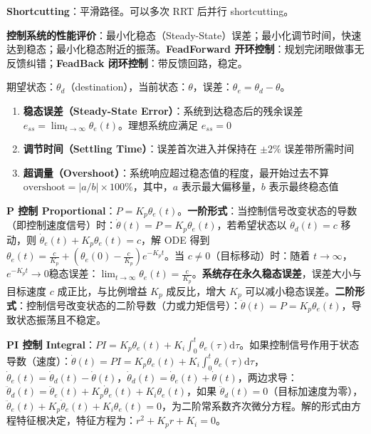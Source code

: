 \documentclass[
  8pt]{extarticle}
\begin{document}
\begin{multicols*}{4}
\textbf{Shortcutting}：平滑路径。可以多次 RRT 后并行 shortcutting。

\textbf{控制系统的性能评价}：最小化稳态（Steady-State）误差；最小化调节时间，快速达到稳态；最小化稳态附近的振荡。\textbf{FeadForward
开环控制}：规划完闭眼做事无反馈纠错；\textbf{FeadBack
闭环控制}：带反馈回路，稳定。

期望状态：\(\theta_d\)（destination），当前状态：\(\theta\)，误差：\(\theta_e = \theta_d - \theta\)。

\begin{enumerate}
\def\labelenumi{\arabic{enumi}.}
\item
  \textbf{稳态误差（Steady-State Error）}：系统到达稳态后的残余误差
  \(e_{ss} = \lim_{t\to\infty} \theta_e(t)\)。理想系统应满足
  \(e_{ss}=0\)
\item
  \textbf{调节时间（Settling Time）}：误差首次进入并保持在 \(\pm 2\%\)
  误差带所需时间
\item
  \textbf{超调量（Overshoot）}：系统响应超过稳态值的程度，最开始过去不算
  \(\text{overshoot} = |a/b| \times 100\%\)，其中，\(a\)
  表示最大偏移量，\(b\) 表示最终稳态值
\end{enumerate}

\textbf{P 控制
Proportional}：\(P = K_p\theta_e(t)\)。\textbf{一阶形式}：当控制信号改变状态的导数（即控制速度信号）时：\(\dot{\theta}(t) = P = K_p\theta_e(t)\)，若希望状态以
\(\dot{\theta}_d(t) = c\) 移动，则
\(\dot{\theta}_e(t) + K_p\theta_e(t) = c\)，解 ODE 得到
\(\theta_e(t) = \frac{c}{K_p} + \left(\theta_e(0) - \frac{c}{K_p}\right)e^{-K_pt}\)。当
\(c\neq0\)（目标移动）时：随着
\(t\rightarrow\infty\)，\(e^{-K_pt}\rightarrow0\)稳态误差：\(\lim_{t\rightarrow\infty}\theta_e(t) = \frac{c}{K_p}\)。\textbf{系统存在永久稳态误差}，误差大小与目标速度
\(c\) 成正比，与比例增益 \(K_p\) 成反比，增大 \(K_p\)
可以减小稳态误差。\textbf{二阶形式}：控制信号改变状态的二阶导数（力或力矩信号）：\(\ddot{\theta}(t) = P = K_p\theta_e(t)\)，导致状态振荡且不稳定。

\textbf{PI 控制
Integral}：\(PI = K_p \theta_e(t) + K_i \int_0^t \theta_e(\tau) \mathrm{d}\tau\)。如果控制信号作用于状态导数（速度）：\(\dot{\theta}(t) = PI = K_p \theta_e(t) + K_i \int_0^t \theta_e(\tau) \mathrm{d}\tau\)，\(\dot{\theta}_e(t) = \dot{\theta}_d(t) - \dot{\theta}(t)\)，\(\dot{\theta}_d(t) = \dot{\theta}_e(t) + \dot{\theta}(t)\)，两边求导：\(\ddot{\theta}_d(t) = \ddot{\theta}_e(t) + K_p \dot{\theta}_e(t) + K_i \theta_e(t)\)，如果
\(\ddot{\theta}_d(t) = 0\)（目标加速度为零），\(\ddot{\theta}_e(t) + K_p \dot{\theta}_e(t) + K_i \theta_e(t) = 0\)，为二阶常系数齐次微分方程。解的形式由方程特征根决定，特征方程为：\(r^2 + K_p r + K_i = 0\)。


\end{multicols*}
\end{document}
